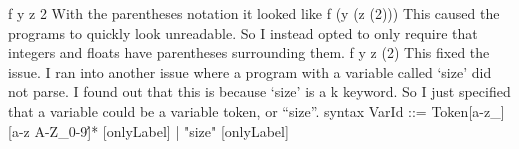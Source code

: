 f y z 2
With the parentheses notation it looked like
f (y (z (2)))
This caused the programs to quickly look unreadable. So I instead opted to only require that integers and floats have parentheses surrounding them.
f y z (2)
This fixed the issue.
I ran into another issue where a program with a variable called ‘size’ did not parse. I found out that this is because ‘size’ is a k keyword. So I just specified that a variable could be a variable token, or “size”.
syntax VarId ::= Token{[a-z\_][a-z A-Z\_0-9\']*} [onlyLabel] | "size" [onlyLabel]